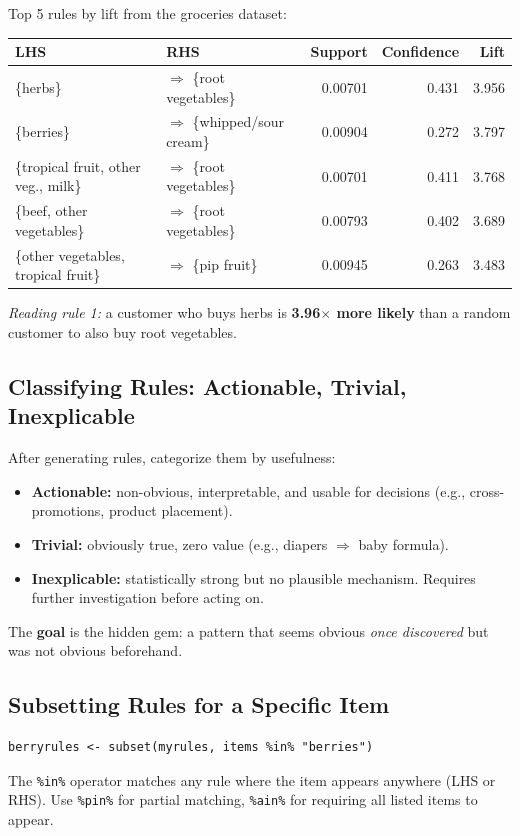 \documentclass[11pt]{article}
\begin{document}
Top 5 rules by lift from the groceries dataset:
\begin{center}
\begin{tabular}{@{}llrrr@{}}
\toprule
\textbf{LHS} & \textbf{RHS} & \textbf{Support} & \textbf{Confidence} & \textbf{Lift} \\
\midrule
\{herbs\}                            & $\Rightarrow$ \{root vegetables\}  & 0.00701 & 0.431 & 3.956 \\
\{berries\}                          & $\Rightarrow$ \{whipped/sour cream\}& 0.00904 & 0.272 & 3.797 \\
\{tropical fruit, other veg., milk\} & $\Rightarrow$ \{root vegetables\}  & 0.00701 & 0.411 & 3.768 \\
\{beef, other vegetables\}           & $\Rightarrow$ \{root vegetables\}  & 0.00793 & 0.402 & 3.689 \\
\{other vegetables, tropical fruit\} & $\Rightarrow$ \{pip fruit\}        & 0.00945 & 0.263 & 3.483 \\
\bottomrule
\end{tabular}
\end{center}

\textit{Reading rule 1:} a customer who buys herbs is \textbf{3.96$\times$
more likely} than a random customer to also buy root vegetables.

\subsection{Classifying Rules: Actionable, Trivial, Inexplicable}
After generating rules, categorize them by usefulness:

\begin{itemize}
    \item \textbf{Actionable:} non-obvious, interpretable, and usable for
      decisions (e.g., cross-promotions, product placement).
    \item \textbf{Trivial:} obviously true, zero value (e.g., diapers
      $\Rightarrow$ baby formula).
    \item \textbf{Inexplicable:} statistically strong but no plausible
      mechanism. Requires further investigation before acting on.
\end{itemize}

The \textbf{goal} is the hidden gem: a pattern that seems obvious
\emph{once discovered} but was not obvious beforehand.

\subsection{Subsetting Rules for a Specific Item}
\begin{verbatim}
berryrules <- subset(myrules, items %in% "berries")
\end{verbatim}
The \texttt{\%in\%} operator matches any rule where the item appears
anywhere (LHS or RHS). Use \texttt{\%pin\%} for partial matching,
\texttt{\%ain\%} for requiring all listed items to appear.
\end{document}
